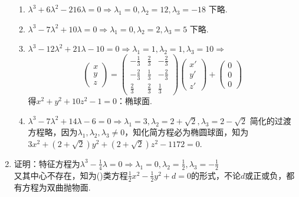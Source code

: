 \documentclass[UTF8]{ctexart}
\begin{document}
\begin{enumerate}
\begin{enumerate}[(1)]
\item $\lambda^3+6\lambda^2-216\lambda=0\Rightarrow\lambda_1=0,\lambda_2=12,\lambda_3=-18$
下略.

\item $\lambda^3-7\lambda^2+10\lambda=0\Rightarrow\lambda_1=0,\lambda_2=2,\lambda_3=5$
下略.

\item $\lambda^3-12\lambda^2+21\lambda-10=0\Rightarrow\lambda_1=1,\lambda_2=1,\lambda_3=10\Rightarrow$
$$\left(\begin{array}{c}x\\y\\z\end{array}\right)=\left(\begin{array}{ccc}\displaystyle-\frac{1}{3}&\displaystyle\frac{2}{3}&\displaystyle-\frac{2}{3}\\\displaystyle-\frac{2}{3}&\displaystyle\frac{1}{3}&\displaystyle-\frac{2}{3}\\\displaystyle\frac{2}{3}&\displaystyle\frac{2}{3}&\displaystyle\frac{1}{3}\end{array}\right)\left(\begin{array}{c}x'\\y'\\z'\end{array}\right)+\left(\begin{array}{c}0\\0\\0\end{array}\right)$$
得$x^2+y^2+10z^2-1=0$：椭球面.

\item $\lambda^3-7\lambda^2+14\lambda-6=0\Rightarrow\lambda_1=3,\lambda_2=2+\sqrt{2},\lambda_3=2-\sqrt{2}$
简化的过渡方程略，因为$\lambda_1,\lambda_2,\lambda_3\neq0$，知化简方程必为椭圆球面，知为$3x^2+(2+\sqrt{2})y^2+(2+\sqrt{2})z^2-1172=0$.
\end{enumerate}

\item 证明：特征方程为$\lambda^3-\displaystyle\frac{1}{4}\lambda=0\Rightarrow\lambda_1=0,\lambda_2=\displaystyle\frac{1}{2},\lambda_3=-\displaystyle\frac{1}{2}$\\
又其中心不存在，知为(\uppercase\expandafter{})类方程$\displaystyle\frac{1}{2}x^2-\displaystyle\frac{1}{2}y^2+d=0$的形式，不论$d$或正或负，都有方程为双曲抛物面. 


\end{enumerate}
\end{document}
